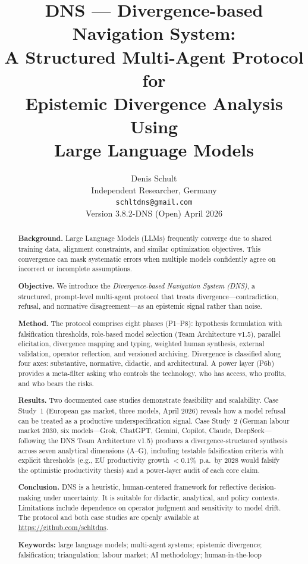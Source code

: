\documentclass[10pt,a4paper]{article}
\title{\textbf{DNS — Divergence-based Navigation System}:\\
       A Structured Multi-Agent Protocol for\\
       Epistemic Divergence Analysis Using\\
       Large Language Models}
\author{Denis Schult\\
        Independent Researcher, Germany\\
        \texttt{schltdns@gmail.com}\\[0.5em]
        \small Version 3.8.2-DNS (Open) \quad April 2026}
\date{}
\begin{document}
\maketitle

\begin{abstract}
\noindent\textbf{Background.}
Large Language Models (LLMs) frequently converge due to shared training data,
alignment constraints, and similar optimization objectives.
This convergence can mask systematic errors when multiple models confidently agree
on incorrect or incomplete assumptions.

\noindent\textbf{Objective.}
We introduce the \textit{Divergence-based Navigation System (DNS)}, a structured,
prompt-level multi-agent protocol that treats divergence—contradiction, refusal, and
normative disagreement—as an epistemic signal rather than noise.

\noindent\textbf{Method.}
The protocol comprises eight phases (P1–P8): hypothesis formulation with
falsification thresholds, role-based model selection (Team Architecture v1.5),
parallel elicitation, divergence mapping and typing, weighted human synthesis,
external validation, operator reflection, and versioned archiving.
Divergence is classified along four axes: substantive, normative, didactic, and
architectural.
A power layer (P6b) provides a meta-filter asking who controls the technology,
who has access, who profits, and who bears the risks.

\noindent\textbf{Results.}
Two documented case studies demonstrate feasibility and scalability.
Case Study~1 (European gas market, three models, April 2026) reveals how a
model refusal can be treated as a productive underspecification signal.
Case Study~2 (German labour market 2030, six models—Grok, ChatGPT, Gemini,
Copilot, Claude, DeepSeek—following the DNS Team Architecture v1.5) produces a
divergence-structured synthesis across seven analytical dimensions (A–G), including
testable falsification criteria with explicit thresholds (e.g., EU productivity
growth $<0.1\%$~p.a.\ by 2028 would falsify the optimistic productivity thesis)
and a power-layer audit of each core claim.

\noindent\textbf{Conclusion.}
DNS is a heuristic, human-centered framework for reflective decision-making under
uncertainty. It is suitable for didactic, analytical, and policy contexts. Limitations
include dependence on operator judgment and sensitivity to model drift.
The protocol and both case studies are openly available at
\url{https://github.com/schltdns}.

\bigskip
\noindent\textbf{Keywords:} large language models; multi-agent systems; epistemic
divergence; falsification; triangulation; labour market; AI methodology; human-in-the-loop
\end{abstract}
\end{document}
